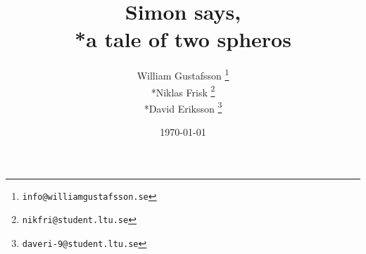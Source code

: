 \documentclass[11pt, twocolumn]{article}
\begin{document}
\author{William Gustafsson \footnote{\tt{info@williamgustafsson.se}} \\*Niklas Frisk \footnote{\tt{nikfri@student.ltu.se}} \\*David Eriksson \footnote{\tt{daveri-9@student.ltu.se}}}

\title{Simon says, \\*a tale of two spheros}
\date{\today}

\maketitle

	
	
	
	
	
	
	
	
	
\end{document}
